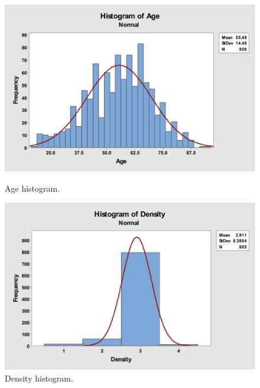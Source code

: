 \documentclass[12pt]{article}
\begin{document}
    \begin{figure}[H]
      \centering
      \begin{minipage}[b]{0.45\textwidth}
        \includegraphics[width=\textwidth]{age-histogram}
        \caption{Age histogram.}
        \label{fig:age-histogram}
      \end{minipage}
      \hfill
      \begin{minipage}[b]{0.45\textwidth}
        \includegraphics[width=\textwidth]{density-histogram}
        \caption{Density histogram.}
        \label{fig:density-histogram}
      \end{minipage}
    \end{figure}
\end{document}
